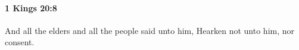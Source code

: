 
		\paragraph{1 Kings 20:8} %
			\label{1KINGS-20-8}

			And all the elders and all the people said unto him, Hearken not unto him, nor consent.


